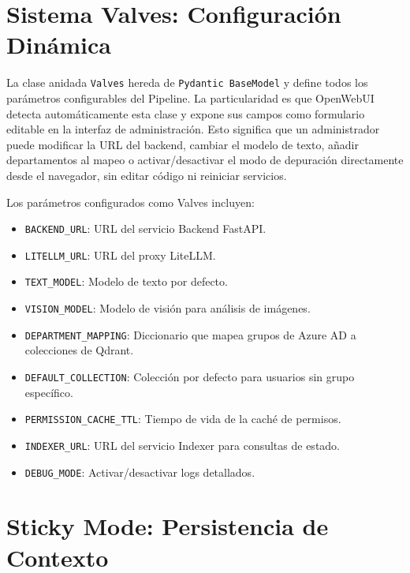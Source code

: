 \section{Sistema Valves: Configuración Dinámica}
\label{anexo:valves}

La clase anidada \texttt{Valves} hereda de \texttt{Pydantic BaseModel} y define todos los parámetros configurables del Pipeline. La particularidad es que OpenWebUI detecta automáticamente esta clase y expone sus campos como formulario editable en la interfaz de administración. Esto significa que un administrador puede modificar la URL del backend, cambiar el modelo de texto, añadir departamentos al mapeo o activar/desactivar el modo de depuración directamente desde el navegador, sin editar código ni reiniciar servicios.

Los parámetros configurados como Valves incluyen:

\begin{itemize}
    \item \texttt{BACKEND\_URL}: URL del servicio Backend FastAPI.
    \item \texttt{LITELLM\_URL}: URL del proxy LiteLLM.
    \item \texttt{TEXT\_MODEL}: Modelo de texto por defecto.
    \item \texttt{VISION\_MODEL}: Modelo de visión para análisis de imágenes.
    \item \texttt{DEPARTMENT\_MAPPING}: Diccionario que mapea grupos de Azure AD a colecciones de Qdrant.
    \item \texttt{DEFAULT\_COLLECTION}: Colección por defecto para usuarios sin grupo específico.
    \item \texttt{PERMISSION\_CACHE\_TTL}: Tiempo de vida de la caché de permisos.
    \item \texttt{INDEXER\_URL}: URL del servicio Indexer para consultas de estado.
    \item \texttt{DEBUG\_MODE}: Activar/desactivar logs detallados.
\end{itemize}

\section{Sticky Mode: Persistencia de Contexto}
\label{anexo:sticky-mode}


